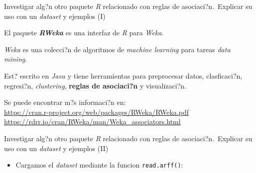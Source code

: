 \documentclass[
  ignorenonframetext,
]{beamer}
\providecommand{\tightlist}{%
  \setlength{\itemsep}{0pt}\setlength{\parskip}{0pt}}
\begin{document}
\begin{frame}{Investigar alg?n otro paquete \emph{R} relacionado con
reglas de asociaci?n.~Explicar su uso con un \emph{dataset} y ejemplos
(I)}
\protect\hypertarget{investigar-algn-otro-paquete-r-relacionado-con-reglas-de-asociacin.-explicar-su-uso-con-un-dataset-y-ejemplos-i}{}

El paquete \textbf{\emph{RWeka}} es una interfaz de \emph{R} para
\emph{Weka}.

\emph{Weka} es una colecci?n de algoritmos de \emph{machine learning}
para tareas \emph{data mining}.

Est? escrito en \emph{Java} y tiene herramientas para preprocesar datos,
clasficaci?n, regresi?n, \emph{clustering}, \textbf{reglas de
asociaci?n} y visualizaci?n.

Se puede encontrar m?s informaci?n en:\\
\url{https://cran.r-project.org/web/packages/RWeka/RWeka.pdf}~\\
\url{https://rdrr.io/cran/RWeka/man/Weka_associators.html}

\end{frame}

\begin{frame}[fragile]{Investigar alg?n otro paquete \emph{R}
relacionado con reglas de asociaci?n.~Explicar su uso con un
\emph{dataset} y ejemplos (II)}
\protect\hypertarget{investigar-algn-otro-paquete-r-relacionado-con-reglas-de-asociacin.-explicar-su-uso-con-un-dataset-y-ejemplos-ii}{}

\begin{itemize}
\tightlist
\item
  Cargamos el \emph{dataset} mediante la funcion \texttt{read.arff()}:
\end{itemize}

\end{frame}
\end{document}
